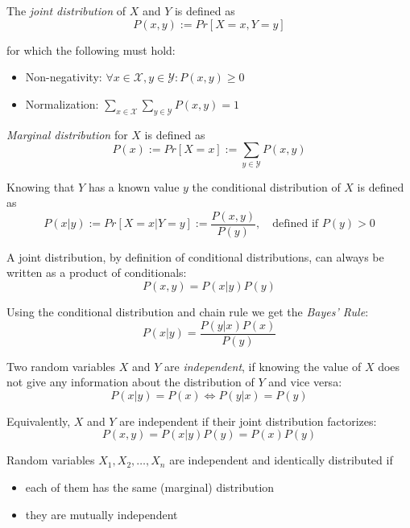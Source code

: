 \begin{definition}
The \textit{joint distribution} of \(X\) and \(Y\) is defined as \[
P(x, y) := Pr[X = x, Y = y]
\]

for which the following must hold:
\begin{itemize}
\item Non-negativity: \(\forall x \in \mathcal{X}, y \in \mathcal{Y}: P(x, y) \geq 0\)
\item Normalization: \(\sum_{x \in \mathcal{X}} \sum_{y \in \mathcal{Y}} P(x, y) = 1\)
\end{itemize}
\end{definition}

\begin{definition}
\textit{Marginal distribution} for \(X\) is defined as \[
P(x) := Pr[X = x] := \sum_{y \in \mathcal{Y}} P(x, y)
\]
\end{definition}

\begin{definition}
Knowing that \(Y\) has a known value \(y\) the conditional distribution of \(X\) is defined as \[
P(x|y) := Pr[X = x|Y = y] := \frac{P(x,y)}{P(y)},\quad \text{defined if } P(y) > 0
\]
\end{definition}

\begin{remark}
A joint distribution, by definition of conditional distributions, can always be written as a product of conditionals: \[P(x,y) = P(x|y)P(y)\]
\end{remark}

\begin{definition}
Using the conditional distribution and chain rule we get the \textit{Bayes' Rule}:
\[
P(x|y) = \frac{P(y|x)P(x)}{P(y)}
\]
\end{definition}

\begin{definition}[Independence]
Two random variables \(X\) and \(Y\) are \textit{independent}, if knowing the value of \(X\) does not give any information about the distribution of \(Y\) and vice versa:
\[
P(x|y) = P(x) \Leftrightarrow P(y|x) = P(y)
\]

Equivalently, \(X\) and \(Y\) are independent if their joint distribution factorizes:
\[
P(x,y) = P(x|y)P(y) = P(x)P(y)
\]
\end{definition}

\begin{definition}
Random variables \(X_1, X_2, \ldots, X_n\) are independent and identically distributed if
\begin{itemize}
\item each of them has the same (marginal) distribution
\item they are mutually independent
\end{itemize}
\end{definition}

